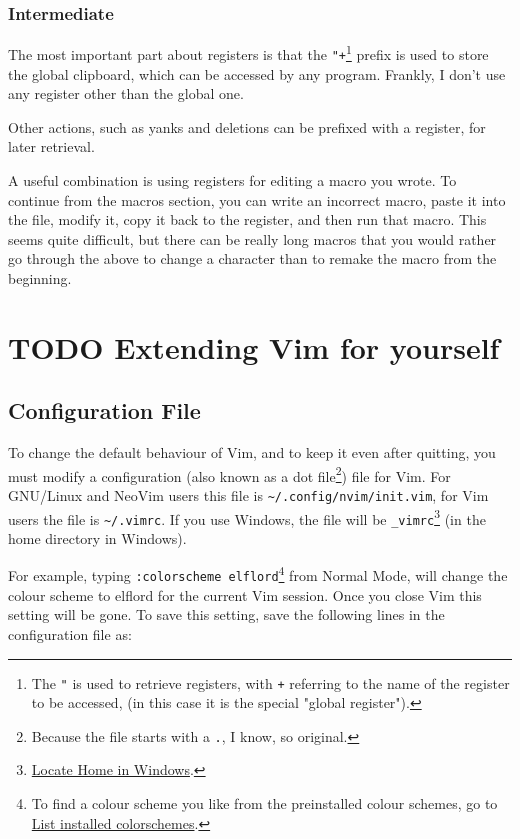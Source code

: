 \documentclass[11pt]{article}
\begin{document}
\subsubsection{Intermediate}
\label{sec:orge561e8d}
The most important part about registers is that the \texttt{"+}\footnote{The \texttt{"} is used to retrieve registers, with \texttt{+} referring to 
the name of the register to be accessed, (in this case it is the 
special "global register").} prefix is used
to store the global clipboard, which can be accessed by any program. Frankly, I
don't use any register other than the global one.

Other actions, such as yanks and deletions can be prefixed with a register, for
later retrieval.

A useful combination is using registers for editing a macro you wrote. To
continue from the macros section, you can write an incorrect macro, paste it
into the file, modify it, copy it back to the register, and then run that macro.
This seems quite difficult, but there can be really long macros that you would
rather go through the above to change a character than to remake the macro from
the beginning.
\section{{\bfseries\sffamily TODO} Extending Vim for yourself}
\label{sec:orgae098bb}
\subsection{Configuration File}
\label{sec:orgc534192}
To change the default behaviour of Vim, and to keep it even after quitting, you
must modify a configuration (also known as a dot file\footnote{Because the file starts with a \texttt{.}, I know, so original.}) file for Vim. For
GNU/Linux and NeoVim users this file is \texttt{\textasciitilde{}/.config/nvim/init.vim}, for Vim users
the file is \texttt{\textasciitilde{}/.vimrc}. If you use Windows, the file will be \texttt{\_vimrc}\footnote{\href{https://superuser.com/questions/86246/where-should-the-vimrc-file-be-located-on-windows-7}{Locate Home in Windows}.} (in
the home directory in Windows).

For example, typing \texttt{:colorscheme elflord}\footnote{To find a colour scheme you like from the preinstalled colour 
schemes, go to \href{https://stackoverflow.com/questions/7331940/how-to-get-the-list-of-all-installed-color-schemes-in-vim}{List installed colorschemes}.} from Normal Mode, will change
the colour scheme to elflord for the current Vim session. Once you close Vim
this setting will be gone. To save this setting, save the following lines in the
configuration file as:
\end{document}
